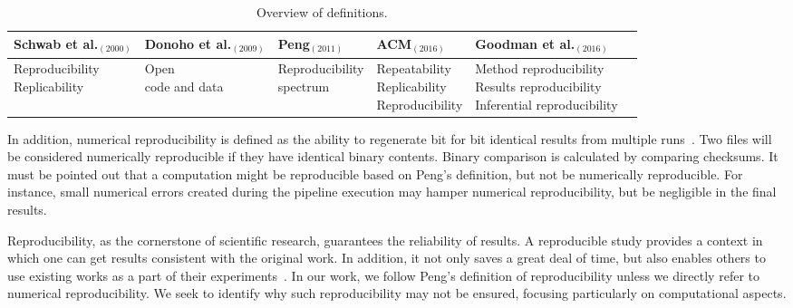 \setlength{\tabcolsep}{1pt}
\begin{table}[H]
\hspace*{-1cm}
\caption{Overview of definitions.}
\label{table:definitions}
\centering
\begin{threeparttable}
\begin{tabular}{@{}llllll@{}}
\toprule
Schwab et al.$_{(2000)}$ & Donoho et al.$_{(2009)}$ & Peng$_{(2011)}$ & 
ACM$_{(2016)}$ & Goodman et al.$_{(2016)}$ \\ \midrule
\makecell{Reproducibility \\ Replicability} &   \makecell{Open \\ code 
and data} &   \makecell{Reproducibility \\ spectrum}  &   
\makecell{Repeatability \\ Replicability \\ Reproducibility} & 
\makecell{Method reproducibility \\ Results reproducibility \\ Inferential reproducibility}    \\ \bottomrule
\end{tabular}
\end{threeparttable}
\end{table}

In addition, numerical reproducibility is defined as the ability to 
regenerate bit for bit identical results from multiple 
runs~\cite{hill2017numerical}. Two files will be considered numerically 
reproducible if they have identical binary contents. Binary 
comparison is calculated by comparing checksums. It must be pointed out 
that a computation might be reproducible based on Peng's definition, 
but not be numerically reproducible. For instance, small numerical 
errors created during the pipeline execution may hamper numerical 
reproducibility, but be negligible in the final results.

Reproducibility, as the cornerstone of scientific research, guarantees 
the reliability of results. A reproducible study provides a context in which one can get results consistent with the original work.
In addition, it not only saves a great deal of time, but also 
enables others to use existing works as a part of their 
experiments~\cite{plesser2018reproducibility}. 
In our work, we follow Peng's definition of reproducibility 
unless we directly refer to numerical reproducibility. 
We seek to identify why such reproducibility may not be ensured, focusing particularly on computational aspects.

